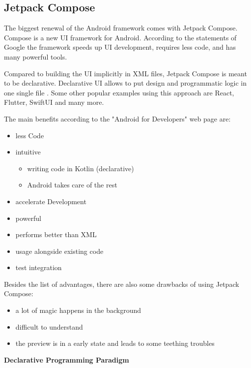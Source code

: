 \subsection{Jetpack Compose}
\label{cha:compose}

The biggest renewal of the Android framework comes with Jetpack Compose. Compose is a new UI framework for Android. According to the statements of Google \cite{android_jetpack_compose} the framework speeds up UI development, requires less code, and has many powerful tools.

Compared to building the UI implicitly in XML files, Jetpack Compose is meant to be declarative. Declarative UI allows to put design and programmatic logic in one single file  \cite{android_jetpack_compose}. Some other popular examples using this approach are React, Flutter, SwiftUI and many more.

\noindent
The main benefits according to the "Android for Developers" web page \cite{android_jetpack_compose} are:
\begin{itemize}
    \item less Code
    \item intuitive
    \begin{itemize}
        \item writing code in Kotlin (declarative)
        \item Android takes care of the rest
    \end{itemize}
    \item accelerate Development
    \item powerful
    \item performs better than XML
    \item usage alongside existing code
    \item test integration
\end{itemize}

Besides the list of advantages, there are also some drawbacks of using Jetpack Compose:

\begin{itemize}
    \item a lot of magic happens in the background
    \item difficult to understand
    \item the preview is in a early state and leads to some teething troubles \\
\end{itemize}

\noindent
\textbf{Declarative Programming Paradigm}


